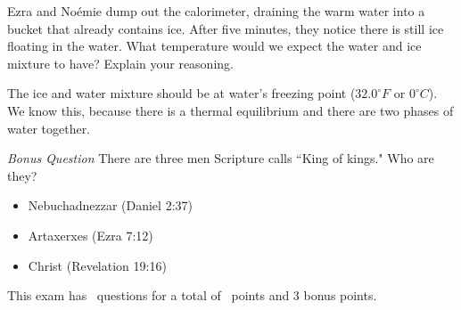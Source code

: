 \documentclass[11pt,addpoints]{exam}   	%
\begin{document}
\begin{questions}
\question[5] Ezra and No\'{e}mie dump out the calorimeter, draining the warm water into a bucket that already contains ice. After five minutes, they notice there is still ice floating in the water. What temperature would we expect the water and ice mixture to have? Explain your reasoning.
\begin{solution}
The ice and water mixture should be at water's freezing point ($32.0 ^{\circ} F$ or $0 ^{\circ} C$).
We know this, because there is a thermal equilibrium and there are two phases of water together.
\end{solution}

\bonusquestion \emph{Bonus Question} There are three men Scripture calls ``King of kings." Who are they?
\begin{solution}
\begin{itemize}
\item Nebuchadnezzar (Daniel 2:37)
\item Artaxerxes (Ezra 7:12)
\item Christ (Revelation 19:16)
\end{itemize}
\end{solution}

\end{questions}

\begin{center}
This exam has \numquestions\ questions for a total of \numpoints\ points and 3 bonus points.
\end{center}

\pagebreak
\end{document}
